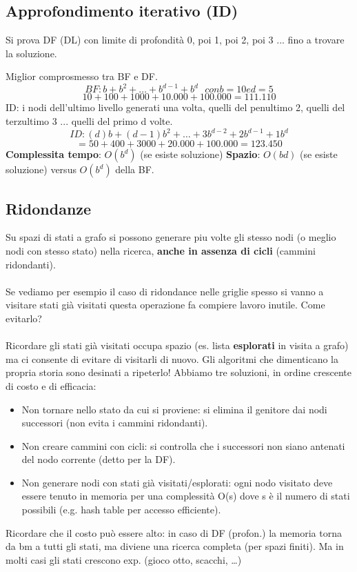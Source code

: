 \subsection{Approfondimento iterativo (ID)}
Si prova DF (DL) con limite di profondità 0, poi 1, poi 2, poi 3 ... fino
a trovare la soluzione.

Miglior comprosmesso tra BF e DF.
$$BF: b + b^2 + \dots + b^{d-1} + b^d \:\:\: con b=10 e d=5$$
$$10 + 100 + 1000 + 10.000 + 100.000 = 111.110$$
ID: i nodi dell'ultimo livello generati una volta, quelli del penultimo 2, quelli
del terzultimo 3 ... quelli del primo d volte.
$$ID: (d)b + (d-1)b^2 + \dots + 3b^{d-2} + 2b^{d-1} + 1b^d$$
$$= 50 + 400 + 3000 + 20.000 + 100.000 = 123.450$$
\textbf{Complessita tempo}: $O(b^d)$ (se esiste soluzione)
\textbf{Spazio}: $O(bd)$ (se esiste soluzione) versus $O(b^d)$ della BF.

\subsection{Ridondanze}
Su spazi di stati a grafo si possono generare piu volte gli stesso nodi 
(o meglio nodi con stesso stato) nella ricerca, \textbf{anche in assenza di cicli}
(cammini ridondanti).\\\\
Se vediamo per esempio il caso di ridondance nelle griglie spesso si vanno a visitare stati
già visitati questa operazione fa compiere lavoro inutile. Come evitarlo?\\\\
Ricordare gli stati già visitati occupa spazio (es. lista \textbf{esplorati} in visita a grafo) ma ci consente di evitare di visitarli di nuovo.
Gli algoritmi che dimenticano la propria storia sono desinati a ripeterlo!
Abbiamo tre soluzioni, in ordine crescente di costo e di efficacia:
\begin{itemize}
	\item Non tornare nello stato da cui si proviene: si elimina il
	genitore dai nodi successori (non evita i cammini ridondanti).
	\item Non creare cammini con cicli: si controlla che i successori
	non siano antenati del nodo corrente (detto per la DF).
	\item Non generare nodi con stati già visitati/esplorati: ogni
	nodo visitato deve essere tenuto in memoria per una
	complessità O(s) dove s è il numero di stati possibili (e.g.
	hash table per accesso efficiente).
\end{itemize}
Ricordare che il costo può essere alto: in caso di DF (profon.) la
memoria torna da bm a tutti gli stati, ma diviene una ricerca
completa (per spazi finiti). Ma in molti casi gli stati crescono exp.
(gioco otto, scacchi, \dots)


